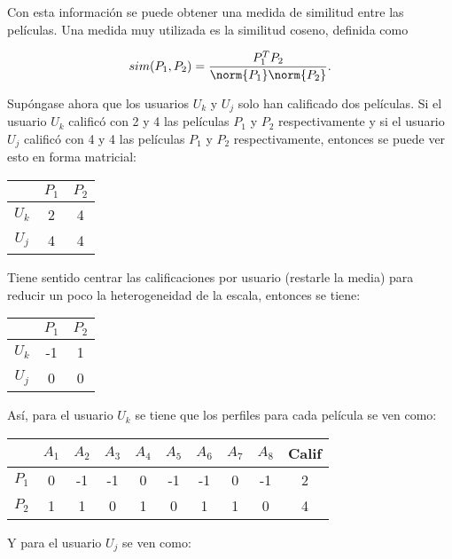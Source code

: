 Con esta información se puede obtener una medida de similitud entre las películas. Una medida muy utilizada es la similitud coseno, definida como

\[
  sim(P_1, P_2) = \frac{P_1^T P_2}{\norm{P_1} \norm{P_2} }.
\]

Supóngase ahora que los usuarios $U_k$ y $U_j$ solo han calificado dos películas. Si el usuario $U_k$ calificó con 2 y 4 las películas $P_1$ y $P_2$ respectivamente y si el usuario $U_j$ calificó con 4 y 4 las películas $P_1$ y $P_2$ respectivamente, entonces se puede ver esto en forma matricial:

\begin{center}
  \begin{tabular}{ c | c  c }
      & $P_1$ & $P_2$ \\
    \hline                       
    $U_k$ & 2 & 4 \\
    $U_j$ & 4 & 4 \\
    \hline  
  \end{tabular}
\end{center}

Tiene sentido centrar las calificaciones por usuario (restarle la media) para reducir un poco la heterogeneidad de la escala, entonces se tiene:

\begin{center}
\begin{tabular}{ c | c  c }
    & $P_1$ & $P_2$ \\
  \hline                       
$U_k$ & -1 & 1 \\
$U_j$ & 0 & 0 \\
  \hline  
\end{tabular}
\end{center}

Así, para el usuario $U_k$ se tiene que los perfiles para cada película se ven como:

\begin{center}
\begin{tabular}{ c | c  c c c c c c c c}
    & $A_1$ & $A_2$ & $A_3$ & $A_4$ & $A_5$ & $A_6$ & $A_7$ & $A_8$ & Calif \\
  \hline                       
$P_1$ & 0 & -1 & -1 & 0 & -1 & -1 & 0 & -1 & 2 \\
$P_2$ & 1 & 1 & 0 & 1 & 0 & 1 & 1 & 0 & 4 \\
  \hline  
\end{tabular}
\end{center}

Y para el usuario $U_j$ se ven como:

